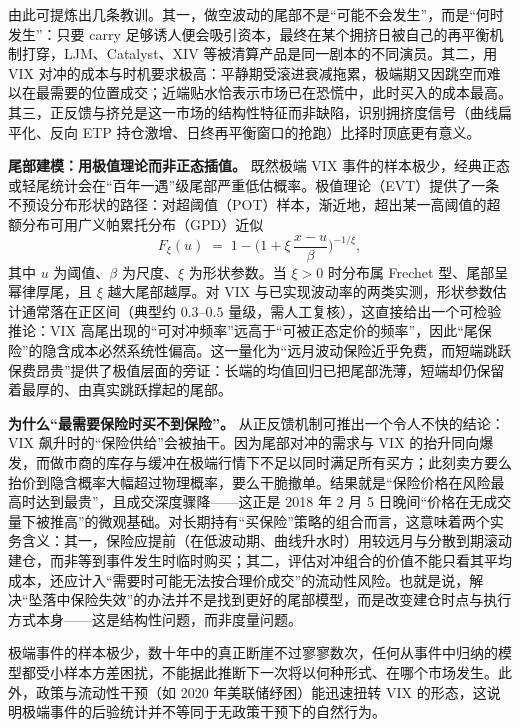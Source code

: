 \documentclass[11pt,a4paper]{ctexart}
\begin{document}
由此可提炼出几条教训。其一，做空波动的尾部不是“可能不会发生”，而是“何时发生”：只要 carry 足够诱人便会吸引资本，最终在某个拥挤日被自己的再平衡机制打穿，LJM、Catalyst、XIV 等被清算产品是同一剧本的不同演员。其二，用 VIX 对冲的成本与时机要求极高：平静期受滚进衰减拖累，极端期又因跳空而难以在最需要的位置成交；近端贴水恰表示市场已在恐慌中，此时买入的成本最高。其三，正反馈与挤兑是这一市场的结构性特征而非缺陷，识别拥挤度信号（曲线扁平化、反向 ETP 持仓激增、日终再平衡窗口的抢跑）比择时顶底更有意义。

\textbf{尾部建模：用极值理论而非正态插值。} 既然极端 VIX 事件的样本极少，经典正态或轻尾统计会在“百年一遇”级尾部严重低估概率。极值理论（EVT）提供了一条不预设分布形状的路径：对超阈值（POT）样本，渐近地，超出某一高阈值的超额分布可用广义帕累托分布（GPD）近似
\[
F_\xi(u)\;=\;1-\Big(1+\xi\,\frac{x-u}{\beta}\Big)^{-1/\xi},
\]
其中 $u$ 为阈值、$\beta$ 为尺度、$\xi$ 为形状参数。当 $\xi>0$ 时分布属 Frechet 型、尾部呈幂律厚尾，且 $\xi$ 越大尾部越厚。对 VIX 与已实现波动率的两类实测，形状参数估计通常落在正区间（典型约 $0.3$–$0.5$ 量级，需人工复核），这直接给出一个可检验推论：VIX 高尾出现的“可对冲频率”远高于“可被正态定价的频率”，因此“尾保险”的隐含成本必然系统性偏高。这一量化为“远月波动保险近乎免费，而短端跳跃保费昂贵”提供了极值层面的旁证：长端的均值回归已把尾部洗薄，短端却仍保留着最厚的、由真实跳跃撑起的尾部。

\textbf{为什么“最需要保险时买不到保险”。} 从正反馈机制可推出一个令人不快的结论：VIX 飙升时的“保险供给”会被抽干。因为尾部对冲的需求与 VIX 的抬升同向爆发，而做市商的库存与缓冲在极端行情下不足以同时满足所有买方；此刻卖方要么抬价到隐含概率大幅超过物理概率，要么干脆撤单。结果就是“保险价格在风险最高时达到最贵”，且成交深度骤降——这正是 2018 年 2 月 5 日晚间“价格在无成交量下被推高”的微观基础。对长期持有“买保险”策略的组合而言，这意味着两个实务含义：其一，保险应提前（在低波动期、曲线升水时）用较远月与分散到期滚动建仓，而非等到事件发生时临时购买；其二，评估对冲组合的价值不能只看其平均成本，还应计入“需要时可能无法按合理价成交”的流动性风险。也就是说，解决“坠落中保险失效”的办法并不是找到更好的尾部模型，而是改变建仓时点与执行方式本身——这是结构性问题，而非度量问题。

极端事件的样本极少，数十年中的真正断崖不过寥寥数次，任何从事件中归纳的模型都受小样本方差困扰，不能据此推断下一次将以何种形式、在哪个市场发生。此外，政策与流动性干预（如 2020 年美联储纾困）能迅速扭转 VIX 的形态，这说明极端事件的后验统计并不等同于无政策干预下的自然行为。

\end{document}
